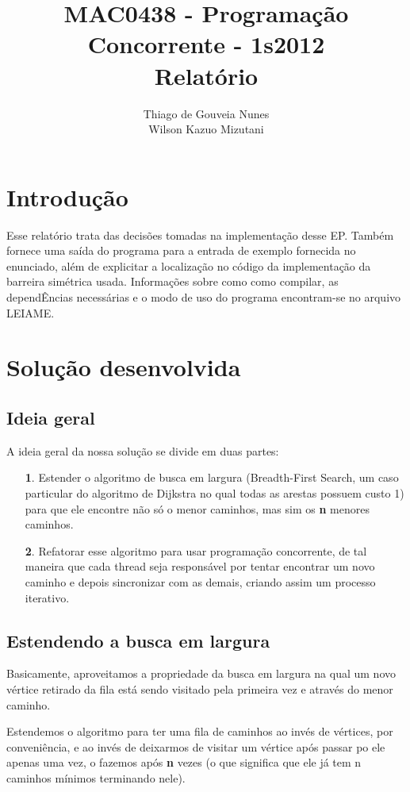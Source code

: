 \documentclass[a4paper,11pt]{article}
\title{MAC0438 - Programação Concorrente - 1s2012 \\ Relatório}
\author{Thiago de Gouveia Nunes \\ Wilson Kazuo Mizutani}
\begin{document}
\maketitle
\tableofcontents

\clearpage
\section{Introdução}
  Esse relatório trata das decisões tomadas na implementação desse EP. Também
fornece uma saída do programa para a entrada de exemplo fornecida no enunciado,
além de explicitar a localização no código da implementação da barreira
simétrica usada.
  Informações sobre como como compilar, as dependÊncias necessárias e o modo de
uso do programa encontram-se no arquivo LEIAME.

\section{Solução desenvolvida}

  \subsection{Ideia geral}
    A ideia geral da nossa solução se divide em duas partes:
      \begin{itemize}
        \item[\textbf 1.]
          Estender o algoritmo de busca em largura (Breadth-First Search, um
          caso particular do algoritmo de Dijkstra no qual todas as arestas
          possuem custo 1) para que ele encontre não só o menor caminhos, mas
          sim os {\textbf n} menores caminhos.
        \item[\textbf 2.]
          Refatorar esse algoritmo para usar programação concorrente, de tal
          maneira que cada thread seja responsável por tentar encontrar um novo
          caminho e depois sincronizar com as demais, criando assim um processo
          iterativo.
      \end{itemize}

  \subsection{Estendendo a busca em largura}
    Basicamente, aproveitamos a propriedade da busca em largura na qual um novo
    vértice retirado da fila está sendo visitado pela primeira vez e através do
    menor caminho.

    Estendemos o algoritmo para ter uma fila de caminhos ao invés de vértices,
    por conveniência, e ao invés de deixarmos de visitar um vértice após passar
    po ele apenas uma vez, o fazemos após {\textbf n} vezes (o que significa
    que ele já tem n caminhos mínimos terminando nele).
\end{document}
